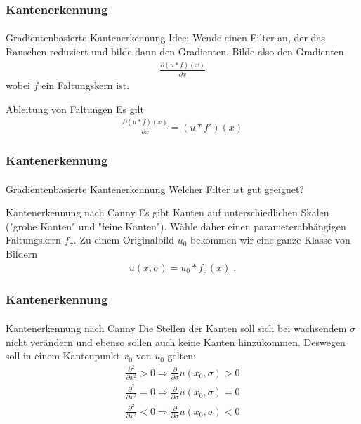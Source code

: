 \documentclass{beamer}
\begin{document}
\begin{frame}
    \frametitle{Kantenerkennung}
\framesubtitle{}
\begin{block}{Gradientenbasierte Kantenerkennung}
Idee: Wende einen Filter an, der das Rauschen reduziert und bilde dann den Gradienten. Bilde also den Gradienten
\begin{align*}
\frac{\partial (u * f)(x)}{\partial x} 
\end{align*}
wobei $f$ ein Faltungskern ist.
\end{block}

\begin{block}{Ableitung von Faltungen}
Es gilt
\begin{align*}
\frac{\partial (u * f)(x)}{\partial x} = (u * f')(x)
\end{align*}

\end{block}

 \end{frame}


\begin{frame}
    \frametitle{Kantenerkennung}
\framesubtitle{}
\begin{block}{Gradientenbasierte Kantenerkennung}
Welcher Filter ist gut geeignet?
\end{block}
\begin{block}{Kantenerkennung nach Canny}
Es gibt Kanten auf unterschiedlichen Skalen ("grobe Kanten" und "feine Kanten"). Wähle daher einen parameterabhängigen Faltungskern
$f_\sigma$. Zu einem Originalbild $u_0$ bekommen wir eine ganze Klasse von Bildern
\begin{align*}
u(x, \sigma) = u_0 * f_\sigma(x) \;.
\end{align*}
 \end{block}

 \end{frame}

\begin{frame}
    \frametitle{Kantenerkennung}
\framesubtitle{}

\begin{block}{Kantenerkennung nach Canny}
Die Stellen der Kanten soll sich bei wachsendem $\sigma$ nicht verändern und ebenso sollen auch keine Kanten hinzukommen. 
Deswegen soll in einem Kantenpunkt $x_0$ von $u_0$ gelten:
\begin{align*}
\frac{\partial^2}{\partial x^2} > 0 \Rightarrow \frac{\partial}{\partial \sigma}  u(x_0, \sigma) > 0 \\
\frac{\partial^2}{\partial x^2} = 0 \Rightarrow \frac{\partial}{\partial \sigma}  u(x_0, \sigma) = 0 \\
\frac{\partial^2}{\partial x^2} < 0 \Rightarrow \frac{\partial}{\partial \sigma}  u(x_0, \sigma) <0
\end{align*}
 \end{block}

 \end{frame}
\end{document}
